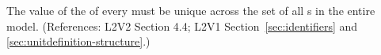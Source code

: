 The value of the   of every \UnitDefinition must be
unique across the set of all \UnitDefinition{}s in the entire
model.  (References: L2V2 Section 4.4; L2V1
Section~\ref{sec:identifiers} and
\ref{sec:unitdefinition-structure}.)

